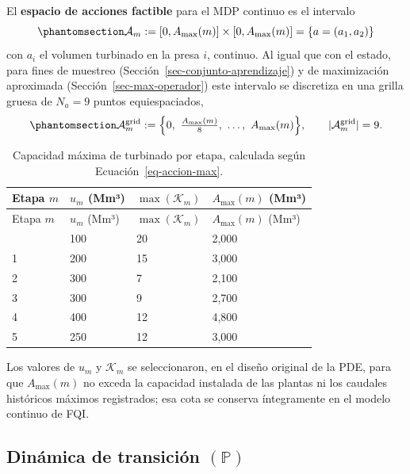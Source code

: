 \documentclass[
  spanish,
  letterpaper,
]{scrreprt}
\theoremstyle{definition}
\theoremstyle{remark}
\begin{document}
El \textbf{espacio de acciones factible} para el MDP continuo es el
intervalo
\begin{equation}\protect\phantomsection\label{eq-espacio-acciones}{\mathcal{A}_m := [0,A_{\max}(m)]\times[0,A_{\max}(m)] = \{a=(a_1,a_2)\}}\end{equation}
con \(a_i\) el volumen turbinado en la presa \(i\), continuo. Al igual
que con el estado, para fines de muestreo
(Sección~\ref{sec-conjunto-aprendizaje}) y de maximización aproximada
(Sección~\ref{sec-max-operador}) este intervalo se discretiza en una
grilla gruesa de \(N_a=9\) puntos equiespaciados,
\begin{equation}\protect\phantomsection\label{eq-grilla-accion}{\mathcal A_m^{\text{grid}} := \Big\{0,\ \tfrac{A_{\max}(m)}{8},\ \dots,\ A_{\max}(m)\Big\}, \qquad |\mathcal A_m^{\text{grid}}|=9.}\end{equation}

\begin{longtable}[]{@{}llll@{}}
\caption{Capacidad máxima de turbinado por etapa, calculada según
Ecuación~\ref{eq-accion-max}.}\tabularnewline
\toprule\noalign{}
Etapa \(m\) & \(u_m\) (Mm³) & \(\max(\mathcal K_m)\) & \(A_{\max}(m)\)
(Mm³) \\
\midrule\noalign{}
\endfirsthead
\toprule\noalign{}
Etapa \(m\) & \(u_m\) (Mm³) & \(\max(\mathcal K_m)\) & \(A_{\max}(m)\)
(Mm³) \\
\midrule\noalign{}
\endhead
\bottomrule\noalign{}
\endlastfoot
0 & 100 & 20 & 2,000 \\
1 & 200 & 15 & 3,000 \\
2 & 300 & 7 & 2,100 \\
3 & 300 & 9 & 2,700 \\
4 & 400 & 12 & 4,800 \\
5 & 250 & 12 & 3,000 \\
\end{longtable}

Los valores de \(u_m\) y \(\mathcal K_{m}\) se seleccionaron, en el
diseño original de la PDE, para que \(A_{\max}(m)\) no exceda la
capacidad instalada de las plantas ni los caudales históricos máximos
registrados; esa cota se conserva íntegramente en el modelo continuo de
FQI.

\subsection{\texorpdfstring{Dinámica de transición
\((\mathbb{P})\)}{Dinámica de transición (\textbackslash mathbb\{P\})}}\label{dinuxe1mica-de-transiciuxf3n-mathbbp}
\end{document}
